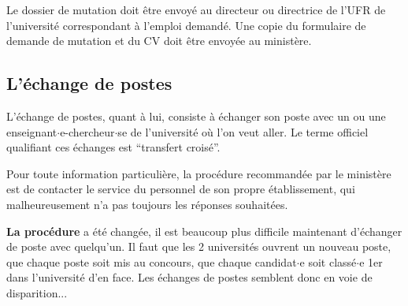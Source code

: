 Le dossier de mutation doit \^etre envoy\'e au directeur ou directrice de l'UFR de l'universit\'e correspondant \`a l'emploi demand\'e. Une copie du formulaire de demande de mutation et du CV doit \^etre envoy\'ee au minist\`ere.



\subsection*{L'\'echange de postes}

L'\'echange de postes, quant \`a lui, consiste \`a \'echanger son
poste avec un ou une enseignant$\cdot$e-chercheur$\cdot$se de l'universit\'e o\`u l'on veut
aller. Le terme officiel qualifiant ces \'echanges est
``transfert crois\'e''.

Pour toute information particuli\`ere, la proc\'edure recommand\'ee
par le minist\`ere est de contacter le service du personnel de son
propre \'etablissement, qui malheureusement n'a pas toujours les r\'eponses
souhait\'ees.

\textbf{La proc\'edure} a \'et\'e chang\'ee, il est beaucoup plus difficile maintenant d'\'echanger de poste avec quelqu'un. 
Il faut que les 2 universit\'es ouvrent un nouveau poste, que chaque poste soit mis au concours, que chaque candidat$\cdot$e soit class\'e$\cdot$e 1er dans l'universit\'e d'en face. 
Les \'echanges de postes semblent donc en voie de disparition... \\

